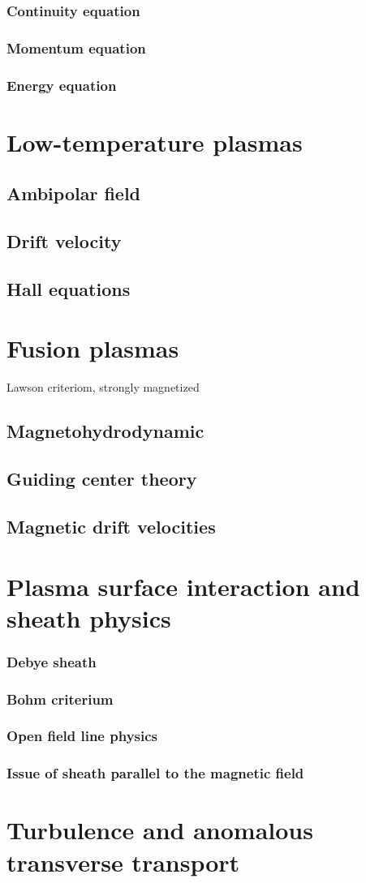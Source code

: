 			\subsubsection{Continuity equation}
			\subsubsection{Momentum equation}
			\subsubsection{Energy equation}
	\section{Low-temperature plasmas}
		\subsection{Ambipolar field}
		\subsection{Drift velocity}
		\subsection{Hall equations}
	\section{Fusion plasmas}
	Lawson criteriom, strongly magnetized
		\subsection{Magnetohydrodynamic}
		\subsection{Guiding center theory}
		\subsection{Magnetic drift velocities}
	\section{Plasma surface interaction and sheath physics}
			\subsubsection{Debye sheath}
			\subsubsection{Bohm criterium}
			\subsubsection{Open field line physics}
			\subsubsection{Issue of sheath parallel to the magnetic field}
	\section{Turbulence and anomalous transverse transport}
		